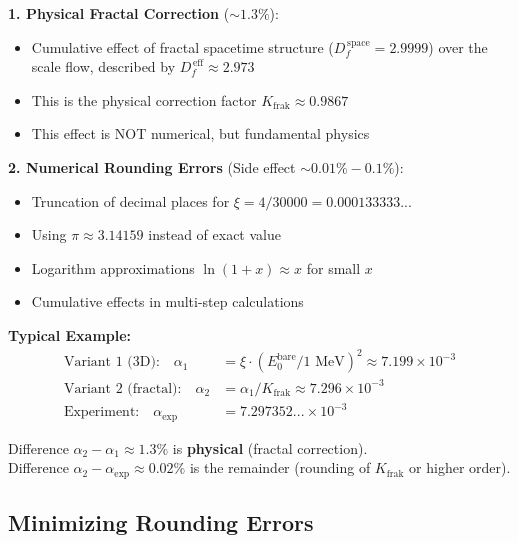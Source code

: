 	\begin{tcolorbox}[colback=green!5!white,colframe=green!75!black,title={Two Types of Corrections in T0 Calculations}]
		\textbf{1. Physical Fractal Correction} ($\sim 1.3\%$):
		\begin{itemize}
			\item Cumulative effect of fractal spacetime structure ($D_f^{\,\text{space}} = 2.9999$) over the scale flow, described by $D_f^{\,\text{eff}} \approx 2.973$
			\item This is the physical correction factor $K_{\text{frak}} \approx 0.9867$
			\item This effect is NOT numerical, but fundamental physics
		\end{itemize}
		
		\textbf{2. Numerical Rounding Errors} (Side effect $\sim 0.01\% - 0.1\%$):
		\begin{itemize}
			\item Truncation of decimal places for $\xi = 4/30000 = 0.000133333...$
			\item Using $\pi \approx 3.14159$ instead of exact value
			\item Logarithm approximations $\ln(1+x) \approx x$ for small $x$
			\item Cumulative effects in multi-step calculations
		\end{itemize}
		
		\textbf{Typical Example:}
		\begin{align}
			\text{Variant 1 (3D):} \quad \alpha_1 &= \xi \cdot (E_0^{\text{bare}}/1\text{ MeV})^2 \approx 7.199 \times 10^{-3} \\
			\text{Variant 2 (fractal):} \quad \alpha_2 &= \alpha_1 / K_{\text{frak}} \approx 7.296 \times 10^{-3} \\
			\text{Experiment:} \quad \alpha_{\text{exp}} &= 7.297352... \times 10^{-3}
		\end{align}
		
		Difference $\alpha_2 - \alpha_1 \approx 1.3\%$ is \textbf{physical} (fractal correction).\\
		Difference $\alpha_2 - \alpha_{\text{exp}} \approx 0.02\%$ is the remainder (rounding of $K_{\text{frak}}$ or higher order).
	\end{tcolorbox}
	
	\subsection{Minimizing Rounding Errors}
	
